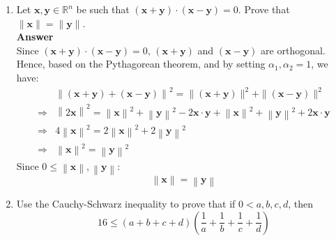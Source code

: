 \documentclass[11pt]{article}
\newcommand{\R}{\mathbb{R}}
\newcommand{\tb}{\textbf}
\theoremstyle{definition}
\begin{document}
\begin{enumerate}
	\item Let $\tb{x},\tb{y} \in \R^n$ be such that $(\tb{x} + \tb{y}) \cdot (\tb{x} - \tb{y}) = 0$. Prove that $\|\tb{x}\| = \|\tb{y}\|$.
        \\
            \textbf{Answer}
        \\
        Since $(\tb{x} + \tb{y}) \cdot (\tb{x} - \tb{y}) = 0$, $(\tb{x} + \tb{y})$ and $(\tb{x} - \tb{y})$ are orthogonal. Hence, based on the Pythagorean theorem, and by setting $\alpha_1, \alpha_2 = 1$, we have:
        \begin{align*}
		& \left\| (\tb{x} + \tb{y}) +  (\tb{x} - \tb{y}) \right\|^2 = \|(\tb{x} + \tb{y})\|^2 + \|(\tb{x} - \tb{y})\|^2\\
        \Rightarrow & \left\| 2\tb{x} \right\|^2 = \left\| \tb{x} \right\|^2 + \left\| \tb{y} \right\|^2 -2\tb{x} \cdot\tb{y} + \left\| \tb{x} \right\|^2 + \left\| \tb{y} \right\|^2 +2\tb{x} \cdot\tb{y} \\
        \Rightarrow & 4\left\|\tb{x} \right\|^2 = 2\left\| \tb{x} \right\|^2 + 2\left\| \tb{y} \right\|^2 
        \\
        \Rightarrow & \left\|\tb{x} \right\|^2 = \left\| \tb{y} \right\|^2 
	\end{align*}
        Since $0 \leq \left\|\tb{x} \right\|, \left\| \tb{y} \right\|$:
        \[\left\|\tb{x} \right\| = \left\| \tb{y} \right\|\]
	
	\item  Use the Cauchy-Schwarz inequality to prove that if $0 < a,b,c,d$, then
	\begin{equation*}
		16 \leq (a + b + c + d) \left( \frac{1}{a} + \frac{1}{b} + \frac{1}{c} + \frac{1}{d} \right)
	\end{equation*}	
	

\end{enumerate}
\end{document}
